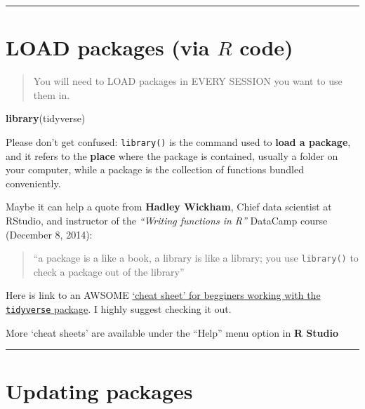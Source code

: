 \documentclass[]{book}
\newenvironment{Shaded}{\begin{snugshade}}{\end{snugshade}}
\newcommand{\KeywordTok}[1]{\textcolor[rgb]{0.13,0.29,0.53}{\textbf{#1}}}
\newcommand{\NormalTok}[1]{#1}
\theoremstyle{definition}
\theoremstyle{definition}
\theoremstyle{definition}
\theoremstyle{remark}
\begin{document}
\begin{center}\rule{0.5\linewidth}{\linethickness}\end{center}

\section{\texorpdfstring{LOAD packages (via \(R\)
code)}{LOAD packages (via R code)}}\label{load-packages-via-r-code}

\begin{quote}
You will need to LOAD packages in EVERY SESSION you want to use them in.
\end{quote}

\begin{Shaded}
\begin{Highlighting}[]
\KeywordTok{library}\NormalTok{(tidyverse)}
\end{Highlighting}
\end{Shaded}

Please don't get confused: \texttt{library()} is the command used to
\textbf{load a package}, and it refers to the \textbf{place} where the
package is contained, usually a folder on your computer, while a package
is the collection of functions bundled conveniently.

Maybe it can help a quote from \textbf{Hadley Wickham}, Chief data
scientist at RStudio, and instructor of the \emph{``Writing functions in
R''} DataCamp course (December 8, 2014):

\begin{quote}
``a package is a like a book, a library is like a library; you use
\texttt{library()} to check a package out of the library''
\end{quote}

Here is link to an AWSOME
\href{http://datacamp-community.s3.amazonaws.com/e63a8f6b-2aa3-4006-89e0-badc294b179c}{`cheat
sheet' for begginers working with the \texttt{tidyverse} package}. I
highly suggest checking it out.

More `cheat sheets' are available under the ``Help'' menu option in
\textbf{R Studio}

\begin{center}\rule{0.5\linewidth}{\linethickness}\end{center}

\section{Updating packages}\label{updating-packages}
\end{document}
